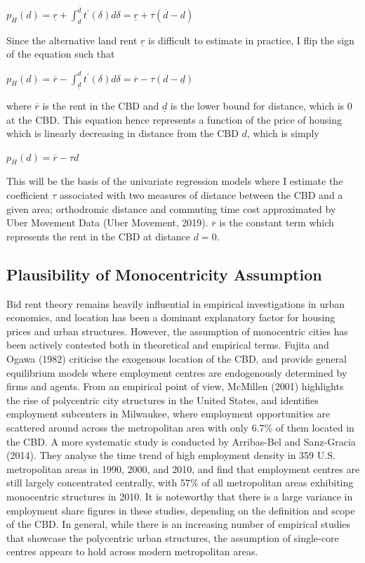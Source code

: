 \documentclass{article}
\begin{document}
\begin{center}
$p _ { H } ( d ) = \underline { r } + \int _ { d } ^ { \overline { d } } t ^ { \prime } ( \delta ) d \delta = \underline { r } + \tau ( \overline { d } - d )$
\end{center}
Since the alternative land rent $\underline{r}$ is difficult to estimate in practice, I flip the sign of the equation such that 
\begin{center}
$p _ { H } ( d ) = \overline { r } - \int _ { \underline { d } } ^ { d } t ^ { \prime } ( \delta ) d \delta = \overline { r } - \tau ( d - \underline { d } )$
\end{center}
where $\overline{r}$ is the rent in the CBD and $\underline{d}$ is the lower bound for distance, which is 0 at the CBD. This equation hence represents a function of the price of housing which is linearly decreasing in distance from the CBD $d$, which is simply
\begin{center}
$p _ { H } ( d ) = \overline { r } - \tau d$
\end{center}
This will be the basis of the univariate regression models where I estimate the coefficient $\tau$ associated with two measures of distance between the CBD and a given area; orthodromic distance and commuting time cost approximated by Uber Movement Data (Uber Movement, 2019). $\overline{r}$ is the constant term which represents the rent in the CBD at distance $d = 0$.

\subsection{Plausibility of Monocentricity Assumption} \label{subsection:monocentricity}
Bid rent theory remains heavily influential in empirical investigations in urban economics, and location has been a dominant explanatory factor for housing prices and urban structures. However, the assumption of monocentric cities has been actively contested both in theoretical and empirical terms. Fujita and Ogawa (1982) criticise the exogenous location of the CBD, and provide general equilibrium models where employment centres are endogenously determined by firms and agents.
From an empirical point of view, McMillen (2001) highlights the rise of polycentric city structures in the United States, and identifies employment subcenters in Milwaukee, where employment opportunities are scattered around across the metropolitan area with only 6.7\% of them located in the CBD. A more systematic study is conducted by Arribas-Bel and Sanz-Gracia (2014). They analyse the time trend of high employment density in 359 U.S. metropolitan areas in 1990, 2000, and 2010, and find that employment centres are still largely concentrated centrally, with 57\% of all metropolitan areas exhibiting monocentric structures in 2010. It is noteworthy that there is a large variance in employment share figures in these studies, depending on the definition and scope of the CBD. In general, while there is an increasing number of empirical studies that showcase the polycentric urban structures, the assumption of single-core centres appears to hold across modern metropolitan areas. 
\end{document}
